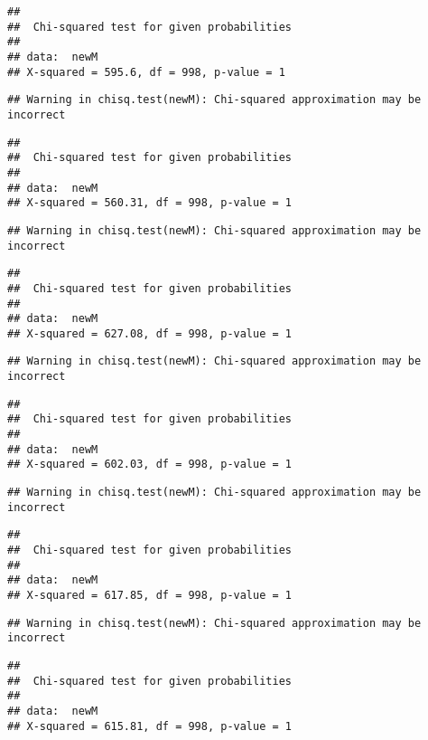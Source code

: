 \documentclass[]{article}
\begin{document}
\begin{verbatim}
## 
##  Chi-squared test for given probabilities
## 
## data:  newM
## X-squared = 595.6, df = 998, p-value = 1
\end{verbatim}

\begin{verbatim}
## Warning in chisq.test(newM): Chi-squared approximation may be incorrect
\end{verbatim}

\begin{verbatim}
## 
##  Chi-squared test for given probabilities
## 
## data:  newM
## X-squared = 560.31, df = 998, p-value = 1
\end{verbatim}

\begin{verbatim}
## Warning in chisq.test(newM): Chi-squared approximation may be incorrect
\end{verbatim}

\begin{verbatim}
## 
##  Chi-squared test for given probabilities
## 
## data:  newM
## X-squared = 627.08, df = 998, p-value = 1
\end{verbatim}

\begin{verbatim}
## Warning in chisq.test(newM): Chi-squared approximation may be incorrect
\end{verbatim}

\begin{verbatim}
## 
##  Chi-squared test for given probabilities
## 
## data:  newM
## X-squared = 602.03, df = 998, p-value = 1
\end{verbatim}

\begin{verbatim}
## Warning in chisq.test(newM): Chi-squared approximation may be incorrect
\end{verbatim}

\begin{verbatim}
## 
##  Chi-squared test for given probabilities
## 
## data:  newM
## X-squared = 617.85, df = 998, p-value = 1
\end{verbatim}

\begin{verbatim}
## Warning in chisq.test(newM): Chi-squared approximation may be incorrect
\end{verbatim}

\begin{verbatim}
## 
##  Chi-squared test for given probabilities
## 
## data:  newM
## X-squared = 615.81, df = 998, p-value = 1
\end{verbatim}
\end{document}
